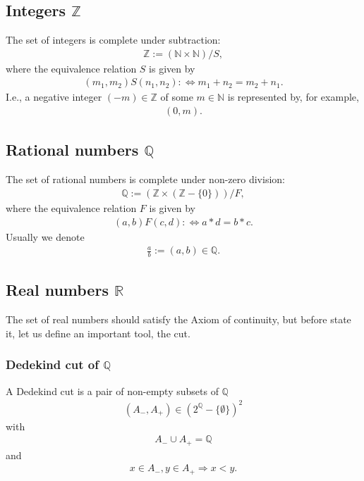 \documentclass[11pt]{book}
\begin{document}
\subsection{Integers $\mathbb{Z}$}
The set of integers is complete under subtraction:
\begin{eqnarray*}
\mathbb{Z} := (\mathbb{N} \times \mathbb{N})/ S,
\end{eqnarray*}
where the equivalence relation $S$ is given by
\begin{eqnarray}
(m_1, m_2)S(n_1,n_2) :\Leftrightarrow m_1 + n_2 = m_2 + n_1.
\end{eqnarray}
I.e., a negative integer $(-m) \in \mathbb{Z}$ of some $m \in \mathbb{N}$ is represented by, for example,
\begin{eqnarray}
(0,m).
\end{eqnarray}

\subsection{Rational numbers $\mathbb{Q}$}
The set of rational numbers is complete under non-zero division:
\begin{eqnarray}
\mathbb{Q} := \left(\mathbb{Z} \times (\mathbb{Z} - \{0\}) \right)/F,
\end{eqnarray}
where the equivalence relation $F$ is given by
\begin{eqnarray}
(a,b) F (c, d) : \Leftrightarrow a * d = b * c.
\end{eqnarray}
Usually we denote
\begin{eqnarray}
\frac{a}{b} := (a,b) \in \mathbb{Q}.
\end{eqnarray}

\subsection{Real numbers $\mathbb{R}$}
The set of real numbers should satisfy the Axiom of continuity, but before state it, let us define an important tool, the cut.

\subsubsection{Dedekind cut of $\mathbb{Q}$}
A Dedekind cut is a pair of non-empty subsets of $\mathbb{Q}$
\begin{eqnarray}
(A_-, A_+) \in (2^\mathbb{Q}-\{\emptyset\})^2
\end{eqnarray}
with
\begin{eqnarray}
A_- \cup A_+ = \mathbb{Q}
\end{eqnarray}
and
\begin{eqnarray}
x \in A_-, y \in A_+ \Rightarrow x < y.
\end{eqnarray}
\end{document}
